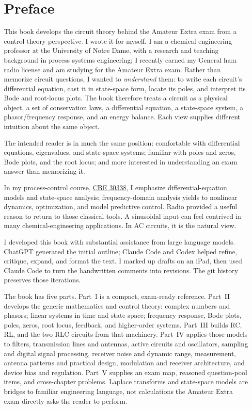 \chapter*{Preface}
This book develops the circuit theory behind the Amateur Extra exam from a
control-theory perspective. I wrote it for myself. I am a chemical
engineering professor at the University of Notre Dame, with a research and
teaching background in process systems engineering; I recently earned my
General ham radio license and am studying for the Amateur Extra exam. Rather
than memorize circuit questions, I wanted to \emph{understand} them: to write
each circuit's differential equation, cast it in state-space form, locate its
poles, and interpret its Bode and root-locus plots. The book therefore treats a
circuit as a physical object, a set of conservation laws, a differential
equation, a state-space system, a phasor/frequency response, and an energy
balance. Each view supplies different intuition about the same object.

The intended reader is in much the same position: comfortable with differential
equations, eigenvalues, and state-space systems; familiar with poles and zeros,
Bode plots, and the root locus; and more interested in understanding an exam
answer than memorizing it.

In my process-control course, \href{https://ndcbe.github.io/controls}{CBE 30338},
I emphasize differential-equation models and state-space analysis; frequency-domain
analysis yields to nonlinear dynamics, optimization, and model predictive control.
Radio provided a useful reason to return to those classical tools. A sinusoidal input
can feel contrived in many chemical-engineering applications. In AC circuits, it is
the natural view.

I developed this book with substantial assistance from large language models.
ChatGPT generated the initial outline; Claude Code and Codex helped refine, critique,
expand, and format the text. I marked up drafts on an iPad, then used Claude
Code to turn the handwritten comments into revisions. The git history preserves
those iterations.

The book has five parts. Part~I is a compact, exam-ready reference. Part~II
develops the generic mathematics and control theory: complex numbers and
phasors; linear systems in time and state space; frequency response, Bode
plots, poles, zeros, root locus, feedback, and higher-order systems. Part~III
builds RC, RL, and the two RLC circuits from that machinery. Part~IV applies
those models to filters, transmission lines and antennas, active circuits and
oscillators, sampling and digital signal processing, receiver noise and
dynamic range, measurement, antenna patterns and practical design, modulation
and receiver architecture, and device bias and regulation. Part~V supplies an
exam map, reasoned
question-pool items, and cross-chapter problems. Laplace transforms and
state-space models are bridges to familiar engineering language, not
calculations the Amateur Extra exam directly asks the reader to perform.


